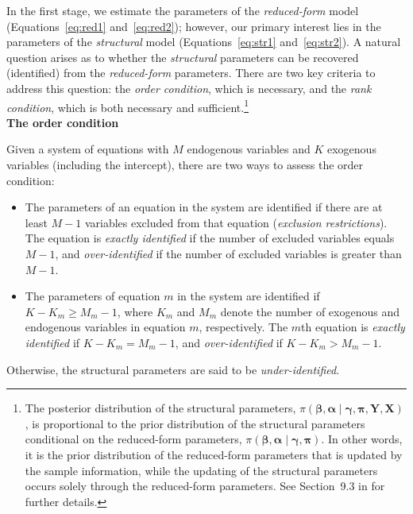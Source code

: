 In the first stage, we estimate the parameters of the \textit{reduced-form} model (Equations~\ref{eq:red1} and~\ref{eq:red2}); however, our primary interest lies in the parameters of the \textit{structural} model (Equations~\ref{eq:str1} and~\ref{eq:str2}). A natural question arises as to whether the \textit{structural} parameters can be recovered (identified) from the \textit{reduced-form} parameters. There are two key criteria to address this question: the \textit{order condition}, which is necessary, and the \textit{rank condition}, which is both necessary and sufficient.\footnote{The posterior distribution of the structural parameters, $\pi(\boldsymbol{\beta}, \boldsymbol{\alpha} \mid \boldsymbol{\gamma}, \boldsymbol{\pi}, \mathbf{Y}, \mathbf{X})$, is proportional to the prior distribution of the structural parameters conditional on the reduced-form parameters, $\pi(\boldsymbol{\beta}, \boldsymbol{\alpha} \mid \boldsymbol{\gamma}, \boldsymbol{\pi})$. In other words, it is the prior distribution of the reduced-form parameters that is updated by the sample information, while the updating of the structural parameters occurs solely through the reduced-form parameters. See Section~9.3 in \cite{zellner1996introduction} for further details.}\\
 
\textbf{The order condition}

Given a system of equations with $M$ endogenous variables and $K$ exogenous variables (including the intercept), there are two ways to assess the order condition:
\begin{itemize}
	\item The parameters of an equation in the system are identified if there are at least $M - 1$ variables excluded from that equation (\textit{exclusion restrictions}). The equation is \textit{exactly identified} if the number of excluded variables equals $M - 1$, and \textit{over-identified} if the number of excluded variables is greater than $M - 1$.
	\item The parameters of equation $m$ in the system are identified if $K - K_m \geq M_m - 1$, where $K_m$ and $M_m$ denote the number of exogenous and endogenous variables in equation $m$, respectively. The $m$th equation is \textit{exactly identified} if $K - K_m = M_m - 1$, and \textit{over-identified} if $K - K_m > M_m - 1$.
\end{itemize}

Otherwise, the structural parameters are said to be \textit{under-identified}.

